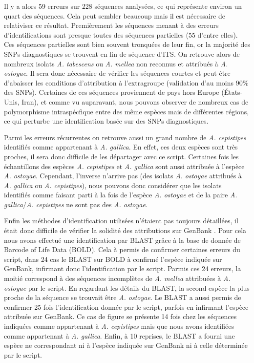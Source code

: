 Il y a alors 59 erreurs sur 228 séquences analysées, ce qui représente environ un quart des séquences. Cela peut sembler beaucoup mais il est nécessaire de relativiser ce résultat. Premièrement les séquences menant à des erreurs d'identifications sont presque toutes des séquences partielles (55 d'entre elles). Ces séquences partielles sont bien souvent tronquées de leur fin, or la majorité des SNPs diagnostiques se trouvent en fin de séquence d'ITS. On retrouve alors de nombreux isolats \textit{A. tabescens} ou \textit{A. mellea} non reconnus et attribués à \textit{A. ostoyae}. Il sera donc nécessaire de vérifier les séquences courtes et peut-être d'abaisser les conditions d'attribution à l'extragroupe (validation d'au moins 90\% des SNPs). Certaines de ces séquences proviennent de pays hors Europe (États-Unis, Iran), et comme vu auparavant, nous pouvons observer de nombreux cas de polymorphisme intraspécfique entre des même espèces mais de différentes régions, ce qui perturbe une identification basée sur des SNPs diagnostiques.

Parmi les erreurs récurrentes on retrouve aussi un grand nombre de \textit{A. cepistipes} identifiés comme appartenant à \textit{A. gallica}. En effet, ces deux espèces sont très proches, il sera donc difficile de les départager avec ce script. Certaines fois les échantillons des espèces \textit{A. cepistipes} et \textit{A. gallica} sont aussi attribuée à l'espèce \textit{A. ostoyae}. Cependant, l'inverse n'arrive pas (des isolats \textit{A. ostoyae} attribués à \textit{A. gallica} ou \textit{A. cepistipes}), nous pouvons donc considérer que les isolats identifiés comme faisant parti à la fois de l'espèce \textit{A. ostoyae} et de la paire \textit{A. gallica}/\textit{A. cepistipes} ne sont pas des \textit{A. ostoyae}.

Enfin les méthodes d'identification utilisées n'étaient pas toujours détaillées, il était donc difficile de vérifier la solidité des attributions sur GenBank \cite{Meiklejohn2019}. Pour cela nous avons effectué une identification par BLAST grâce à la base de donnée de Barcode of Life Data (BOLD). Cela à permis de confirmer certaines erreurs du script, dans 24 cas le BLAST sur BOLD à confirmé l'espèce indiquée sur GenBank, infirmant donc l'identification par le script. Parmis ces 24 erreurs, la moitié correspond à des séquences incomplètes de \textit{A. mellea} attribuées à \textit{A. ostoyae} par le script. En regardant les détails du BLAST, la second espèce la plus proche de la séquence se trouvait être \textit{A. ostoyae}. Le BLAST a aussi permis de confirmer 25 fois l'identification donnée par le script, parfois en infirmant l'espèce attribuée sur GenBank. Ce cas de figure se présente 14 fois chez les séquences indiquées comme appartenant à \textit{A. cepistipes} mais que nous avons identifiées comme appartenant à \textit{A. gallica}. Enfin, à 10 reprises, le BLAST a fourni une espèce ne correspondant ni à l'espèce indiquée sur GenBank ni à celle déterminée par le script.

